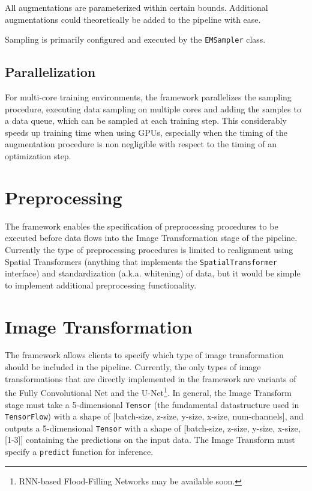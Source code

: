 All augmentations are parameterized within certain bounds. Additional augmentations could theoretically be added to the pipeline with ease.

Sampling is primarily configured and executed by the \texttt{EMSampler} class.

\subsection{Parallelization}

For multi-core training environments, the framework parallelizes the sampling procedure, executing data sampling on multiple cores and adding the samples to a data queue, which can be sampled at each training step. This considerably speeds up training time when using GPUs, especially when the timing of the augmentation procedure is non negligible with respect to the timing of an optimization step.

\section{Preprocessing}

The framework enables the specification of preprocessing procedures to be executed before data flows into the Image Transformation stage of the pipeline. Currently the type of preprocessing procedures is limited to realignment using Spatial Transformers (anything that implements the \texttt{SpatialTransformer} interface) and standardization (a.k.a. whitening) of data, but it would be simple to implement additional preprocessing functionality.

\section{Image Transformation}

The framework allows clients to specify which type of image transformation should be included in the pipeline. Currently, the only types of image transformations that are directly implemented in the framework are variants of the Fully Convolutional Net and the U-Net\footnote{RNN-based Flood-Filling Networks may be available soon.}. In general, the Image Transform stage must take a 5-dimensional \texttt{Tensor} (the fundamental datastructure used in \texttt{TensorFlow}) with a shape of [batch-size, z-size, y-size, x-size, num-channels], and outputs a 5-dimensional \texttt{Tensor} with a shape of [batch-size, z-size, y-size, x-size, [1-3]] containing the predictions on the input data. The Image Transform must specify a \texttt{predict} function for inference.

